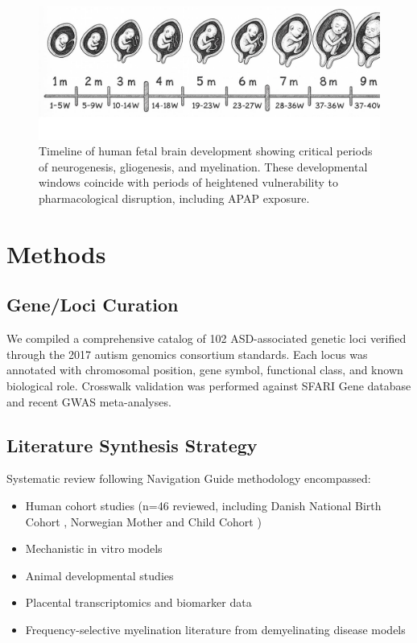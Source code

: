 \documentclass[12pt]{article}
\begin{document}
\begin{figure}[h]
\centering
\includegraphics[width=\textwidth]{../assets/fetal-development.jpg}
\caption{Timeline of human fetal brain development showing critical periods of neurogenesis, gliogenesis, and myelination. These developmental windows coincide with periods of heightened vulnerability to pharmacological disruption, including APAP exposure.}
\label{fig:fetaldevelopment}
\end{figure}

\section{Methods}

\subsection{Gene/Loci Curation}
We compiled a comprehensive catalog of 102 ASD-associated genetic loci verified through the 2017 autism genomics consortium standards. Each locus was annotated with chromosomal position, gene symbol, functional class, and known biological role. Crosswalk validation was performed against SFARI Gene database and recent GWAS meta-analyses.

\subsection{Literature Synthesis Strategy}
Systematic review following Navigation Guide methodology \citep{navarro2025} encompassed:
\begin{itemize}
\item Human cohort studies (n=46 reviewed, including Danish National Birth Cohort \citep{liew2016}, Norwegian Mother and Child Cohort \citep{brandlistuen2013,ystrom2017})
\item Mechanistic in vitro models \citep{perez2012,posadas2019}
\item Animal developmental studies \citep{viberg2014,philippot2022,blecharz2018}
\item Placental transcriptomics and biomarker data \citep{ji2020}
\item Frequency-selective myelination literature from demyelinating disease models
\end{itemize}
\end{document}
